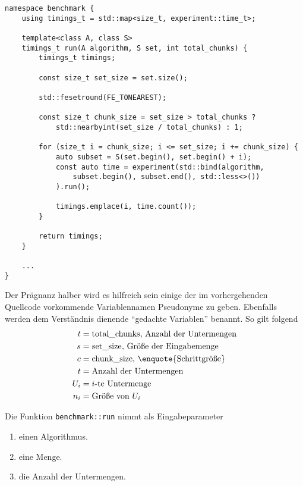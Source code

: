 \begin{lstlisting}[label=lst:benchmark, caption={Implementation einer Funktion zur Ermittlung der praktischen Effizienz eines Algorotihmus mit einer bestimmenten Eingabemenge.}]
namespace benchmark {
	using timings_t = std::map<size_t, experiment::time_t>;

	template<class A, class S>
	timings_t run(A algorithm, S set, int total_chunks) {
		timings_t timings;

		const size_t set_size = set.size();

		std::fesetround(FE_TONEAREST);

		const size_t chunk_size = set_size > total_chunks ?
			std::nearbyint(set_size / total_chunks) : 1;

		for (size_t i = chunk_size; i <= set_size; i += chunk_size) {
			auto subset = S(set.begin(), set.begin() + i);
			const auto time = experiment(std::bind(algorithm,
				subset.begin(), subset.end(), std::less<>())
			).run();

			timings.emplace(i, time.count());
		}

		return timings;
	}
	
	...
}
\end{lstlisting}

Der Prägnanz halber wird es hilfreich sein einige der im vorhergehenden Quellcode vorkommende Variablennamen Pseudonyme zu geben. Ebenfalls werden dem Verständnis dienende \enquote{gedachte Variablen} benannt. So gilt folgend
\begin{equation*}
	\begin{aligned}
		t &= \text{\lstinline{total_chunks}, Anzahl der Untermengen} \\
		s &= \text{\lstinline{set_size}, Größe der Eingabemenge} \\
		c &= \text{\lstinline{chunk_size}, \enquote{Schrittgröße}} \\
		t &= \text{Anzahl der Untermengen} \\
		U_i &= \text{$i$-te Untermenge} \\
		n_i &= \text{Größe von $U_i$} \\
	\end{aligned}
\end{equation*}

Die Funktion \lstinline{benchmark::run} nimmt als Eingabeparameter
\begin{enumerate}[nosep, label=(\alph*)]
	\item einen Algorithmus.
	\item eine Menge.
	\item die Anzahl der Untermengen.
\end{enumerate}

